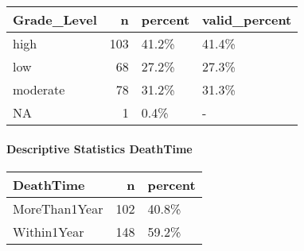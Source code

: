 \documentclass[
]{article}
\newenvironment{Shaded}{\begin{snugshade}}{\end{snugshade}}
\newcommand{\DataTypeTok}[1]{\textcolor[rgb]{0.00,0.34,0.68}{#1}}
\newcommand{\DecValTok}[1]{\textcolor[rgb]{0.69,0.50,0.00}{#1}}
\newcommand{\KeywordTok}[1]{\textcolor[rgb]{0.12,0.11,0.11}{\textbf{#1}}}
\newcommand{\NormalTok}[1]{\textcolor[rgb]{0.12,0.11,0.11}{#1}}
\newcommand{\OperatorTok}[1]{\textcolor[rgb]{0.12,0.11,0.11}{#1}}
\newcommand{\OtherTok}[1]{\textcolor[rgb]{0.00,0.43,0.16}{#1}}
\newcommand{\StringTok}[1]{\textcolor[rgb]{0.75,0.01,0.01}{#1}}
\begin{document}
\begin{longtable}[]{@{}lrll@{}}
\toprule
Grade\_Level & n & percent & valid\_percent\tabularnewline
\midrule
\endhead
high & 103 & 41.2\% & 41.4\%\tabularnewline
low & 68 & 27.2\% & 27.3\%\tabularnewline
moderate & 78 & 31.2\% & 31.3\%\tabularnewline
NA & 1 & 0.4\% & -\tabularnewline
\bottomrule
\end{longtable}

\pagebreak

\hypertarget{descriptive-statistics-deathtime}{%
\paragraph{Descriptive Statistics
DeathTime}\label{descriptive-statistics-deathtime}}

\begin{Shaded}
\end{Shaded}

\begin{longtable}[]{@{}lrl@{}}
\toprule
DeathTime & n & percent\tabularnewline
\midrule
\endhead
MoreThan1Year & 102 & 40.8\%\tabularnewline
Within1Year & 148 & 59.2\%\tabularnewline
\bottomrule
\end{longtable}

\pagebreak

\begin{Shaded}
\end{Shaded}
\end{document}
